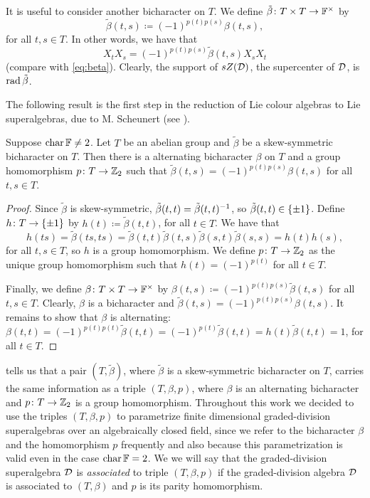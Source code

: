 It is useful to consider another bicharacter on $T$. 
We define $\tilde\beta\colon T\times T \to \mathbb{F}^\times$ by
\[\label{eq:tilde-beta-def}
    \tilde\beta(t,s) \coloneqq (-1)^{p(t)p(s)}\beta(t,s),
\]
for all $t, s\in T$. 
In other words, we have that
\[\label{eq:tilde-beta}
    X_t X_s = (-1)^{p(t)p(s)} \tilde\beta(t,s) X_s X_t
\]
(compare with \cref{eq:beta}). 
Clearly, the support of $sZ(\mathcal{D})$, the supercenter of $\mathcal{D}$, is $\operatorname{rad} \tilde\beta$. 

The following result is the first step in the reduction of Lie colour algebras to Lie superalgebras, due to M. Scheunert (see \cite{MR529734}). 

\begin{prop}\label{prop:skew-bicharacter-grd-SA}
    Suppose $\operatorname{char} \mathbb{F} \neq 2$. 
    Let $T$ be an abelian group and $\tilde\beta$ be a skew-symmetric bicharacter on $T$. 
    Then there is a alternating bicharacter $\beta$ on $T$ and a group homomorphism $p\colon T \to \mathbb{Z}_2$ such that $\tilde\beta(t,s) = (-1)^{p(t)p(s)}\beta(t,s)$ for all $t,s\in T$.
\end{prop}

\begin{proof}
    Since $\tilde\beta$ is skew-symmetric, $\tilde\beta(t,t) = \tilde\beta(t,t)^{-1}$, so $\tilde\beta(t,t)\in \{ \pm 1 \}$. 
    Define $h\colon T \to \{ \pm 1 \}$ by $h(t) \coloneqq \tilde\beta(t,t)$, for all $t\in T$. 
    We have that 
    \[
        h(ts) = \tilde\beta(ts,ts) = \tilde\beta(t,t)\tilde\beta(t,s)\tilde\beta(s,t)\tilde\beta(s,s) = h(t)h(s),
    \] 
    for all $t,s \in T$, so $h$ is a group homomorphism. 
    We define $p\colon T \to \mathbb{Z}_2$ as the unique group homomorphism such that $h(t) = (-1)^{p(t)}$ for all $t\in T$. 
    
    Finally, we define $\beta\colon T\times T \to \mathbb{F}^\times$ by $\beta(t,s) \coloneqq (-1)^{p(t)p(s)}\tilde\beta(t,s)$ for all $t,s\in T$. 
    Clearly, $\beta$ is a bicharacter and $\tilde\beta(t,s) = (-1)^{p(t)p(s)}\beta(t,s)$. 
    It remains to show that $\beta$ is alternating: 
    $\beta(t,t) = (-1)^{p(t)p(t)}\tilde\beta(t,t) = (-1)^{p(t)}\tilde\beta(t,t) = h(t) \tilde\beta(t,t) = 1$, for all $t\in T$.
\end{proof}

 tells us that a pair $(T, \tilde\beta)$, where $\tilde\beta$ is a skew-symmetric bicharacter on $T$, carries the same information as a triple $(T, \beta, p)$, where $\beta$ is an alternating bicharacter and $p\colon T\to \mathbb{Z}_2$ is a group homomorphism. 
Throughout this work we decided to use the triples $(T, \beta, p)$ to parametrize finite dimensional graded-division superalgebras over an algebraically closed field, since we refer to the bicharacter $\beta$ and the homomorphism $p$ frequently and also because this parametrization is valid even in the case $\operatorname{char} \mathbb{F} = 2$. 
We we will say that the graded-division superalgebra $\mathcal{D}$ is \emph{associated} to triple $(T, \beta, p)$ if the graded-division algebra $\mathcal{D}$ is associated to $(T, \beta)$ and $p$ is its parity homomorphism.

